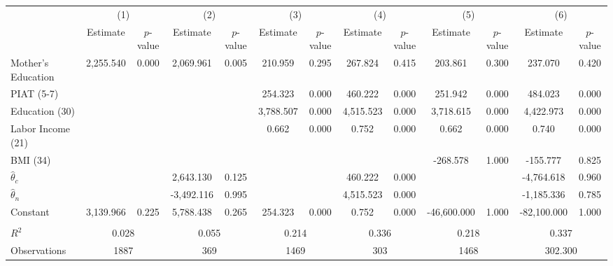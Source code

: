 \begin{tabular}{lcccccccccccc} \toprule
 & \multicolumn{2}{c}{(1)}  &  \multicolumn{2}{c}{(2)}  &  \multicolumn{2}{c}{(3)}  &  \multicolumn{2}{c}{(4)}  & \multicolumn{2}{c}{(5)} & \multicolumn{2}{c}{(6)} \\  
 & Estimate & $p$-value & Estimate & $p$-value & Estimate & $p$-value & Estimate & $p$-value & Estimate & $p$-value & Estimate & $p$-value \\ \midrule
Mother's Education &  2,255.540 &     0.000 &  2,069.961 &     0.005 &   210.959 &     0.295 &   267.824 &     0.415 &   203.861 &     0.300 &   237.070 &     0.420 \\  
PIAT (5-7) &         &         &         &         &   254.323 &     0.000 &   460.222 &     0.000 &   251.942 &     0.000 &   484.023 &     0.000 \\  
Education (30) &         &         &         &         &  3,788.507 &     0.000 &  4,515.523 &     0.000 &  3,718.615 &     0.000 &  4,422.973 &     0.000 \\  
Labor Income (21) &         &         &         &         &     0.662 &     0.000 &     0.752 &     0.000 &     0.662 &     0.000 &     0.740 &     0.000 \\  
BMI (34) &         &         &         &         &         &         &         &         &  -268.578 &     1.000 &  -155.777 &     0.825 \\  
$\hat{\theta}_{c}$&         &         &  2,643.130 &     0.125 &         &         &   460.222 &     0.000 &         &         & -4,764.618 &     0.960 \\  
$\hat{\theta}_{n}$ &         &         & -3,492.116 &     0.995 &         &         &  4,515.523 &     0.000 &         &         & -1,185.336 &     0.785 \\  
Constant &  3,139.966 &     0.225 &  5,788.438 &     0.265 &   254.323 &     0.000 &     0.752 &     0.000 & -46,600.000 &     1.000 & -82,100.000 &     1.000 \\  \\ \midrule
$R^2$ &     \multicolumn{2}{c}{0.028} &     \multicolumn{2}{c}{0.055} &    \multicolumn{2}{c}{0.214} &  \multicolumn{2}{c}{0.336} &  \multicolumn{2}{c}{0.218} &  \multicolumn{2}{c}{0.337} \\  
Observations &  \multicolumn{2}{c}{1887} &   \multicolumn{2}{c}{369} &  \multicolumn{2}{c}{1469} &     \multicolumn{2}{c}{303} &     \multicolumn{2}{c}{1468} & \multicolumn{2}{c}{302.300}  \\ \bottomrule \end{tabular}
